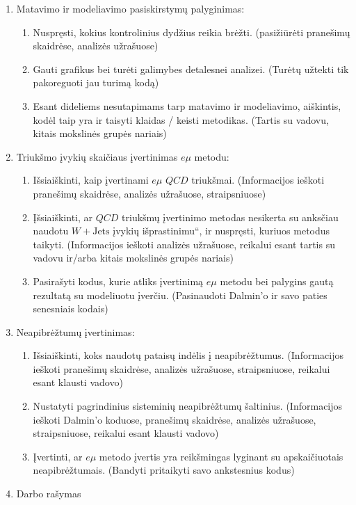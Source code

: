 \documentclass[a4paper, 12pt]{article}
\newcommand{\emu}{e\mu}
\newcommand{\ltq}[1]{{\quotedblbase{}#1\textquotedblleft{}}}
\begin{document}
\begin{enumerate}
	\item Matavimo ir modeliavimo pasiskirstymų palyginimas:
	\begin{enumerate}
		\item Nuspręsti, kokius kontrolinius dydžius reikia brėžti.
		(pasižiūrėti pranešimų skaidrėse, analizės užrašuose)
		\item Gauti grafikus bei turėti galimybes detalesnei analizei.
		(Turėtų užtekti tik pakoreguoti jau turimą kodą)
		\item Esant dideliems nesutapimams tarp matavimo ir modeliavimo, aiškintis, kodėl
		taip yra ir taisyti klaidas / keisti metodikas. (Tartis su vadovu, kitais mokslinės
		grupės nariais)
	\end{enumerate}
	
	\item Triukšmo įvykių skaičiaus įvertinimas $e\mu$ metodu:
	\begin{enumerate}
		\item Išsiaiškinti, kaip įvertinami $e\mu$ $QCD$ triukšmai.
		(Informacijos ieškoti pranešimų skaidrėse, analizės užrašuose, straipsniuose)
		\item Įšsiaiškinti, ar $QCD$ triukšmų įvertinimo metodas nesikerta su anksčiau naudotu
		$W+\mathrm{Jets}$ įvykių \ltq{išprastinimu}, ir nuspręsti, kuriuos metodus taikyti.
		(Informacijos ieškoti analizės užrašuose, reikalui esant tartis su vadovu ir/arba kitais
		mokslinės grupės nariais)
		\item Pasirašyti kodus, kurie atliks įvertinimą $e\mu$ metodu bei palygins gautą rezultatą
		su modeliuotu įverčiu. (Pasinaudoti Dalmin'o ir savo paties senesniais kodais)
	\end{enumerate}
	
	\item Neapibrėžtumų įvertinimas:
	\begin{enumerate}
		\item Išsiaiškinti, koks naudotų pataisų indėlis į neapibrėžtumus. (Informacijos ieškoti
		pranešimų skaidrėse, analizės užrašuose, straipsniuose, reikalui esant klausti vadovo)
		\item Nustatyti pagrindinius sisteminių neapibrėžtumų šaltinius. (Informacijos ieškoti
		Dalmin'o koduose, pranešimų skaidrėse, analizės užrašuose, straipsniuose, reikalui
		esant klausti vadovo)
		\item Įvertinti, ar $\emu$ metodo įvertis yra reikšmingas lyginant su apskaičiuotais
		neapibrėžtumais. (Bandyti pritaikyti savo ankstesnius kodus)
	\end{enumerate}
	
	\item Darbo rašymas
\end{enumerate}
\end{document}
